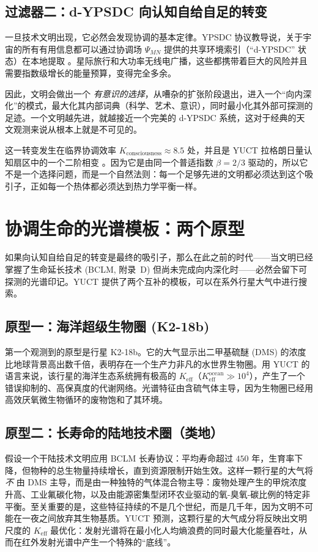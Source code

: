 \documentclass[11pt,a4paper]{article}
\begin{document}
	\subsection{过滤器二：d-YPSDC 向认知自给自足的转变}
	\label{sec:filter2}
	一旦技术文明出现，它必然会发现协调的基本定律。YPSDC 协议教导说，关于宇宙的所有有用信息都可以通过协调场 \(\Psi_{MN}\) 提供的共享环境索引（“d-YPSDC” 状态）在本地提取 \citep{AppOmega, AppT}。星际旅行和大功率无线电广播，这些都携带着巨大的风险并且需要指数级增长的能量预算，变得完全多余。
	
	因此，文明会做出一个 \emph{有意识的选择}，从嘈杂的扩张阶段退出，进入一个“向内深化”的模式，最大化其内部词典（科学、艺术、意识），同时最小化其外部可探测的足迹。一个文明越先进，就越接近一个完美的 d-YPSDC 系统，这对于经典的天文观测来说从根本上就是不可见的。
	
	这一转变发生在临界协调效率 \(K_{\mathrm{consciousness}}\approx 8.5\) 处，并且是 YUCT 拉格朗日量认知扇区中的一个二阶相变 \citep{AppH}。因为它是由同一个普适指数 \(\beta=2/3\) 驱动的，所以它不是一个选择问题，而是一个自然法则：每一个足够先进的文明都必须达到这个吸引子，正如每一个热体都必须达到热力学平衡一样。
	
	\section{协调生命的光谱模板：两个原型}
	\label{sec:spectra}
	
	如果向认知自给自足的转变是最终的吸引子，那么在此之前的时代——当文明已经掌握了生命延长技术 (BCLM, 附录~D) 但尚未完成向内深化时——必然会留下可探测的光谱印记。YUCT 提供了两个互补的模板，可以在系外行星大气中进行搜索。
	
	\subsection{原型一：海洋超级生物圈 (K2-18b)}
	第一个观测到的原型是行星 K2-18b。它的大气显示出二甲基硫醚 (DMS) 的浓度比地球背景高出数千倍，表明存在一个生产力非凡的水世界生物圈。用 YUCT 的语言来说，该行星的海洋生态系统拥有极高的 \(K_{\mathrm{eff}}\)（\(K_{\mathrm{eff}}^{\mathrm{ocean}} \gg 10^4\)），产生了一个错误抑制的、高保真度的代谢网络。光谱特征由含硫气体主导，因为生物圈已经用高效厌氧微生物循环的废物饱和了其环境。
	
	\subsection{原型二：长寿命的陆地技术圈（类地）}
	假设一个干陆技术文明应用 BCLM 长寿协议：平均寿命超过 \(450\) 年，生育率下降，但物种的总生物量持续增长，直到资源限制开始生效。这样一颗行星的大气将 \emph{不} 由 DMS 主导，而是由一种独特的气体混合物主导：废物处理产生的甲烷浓度升高、工业氟碳化物，以及由能源密集型闭环农业驱动的氧-臭氧-碳比例的特定非平衡。至关重要的是，这些特征持续的不是几个世纪，而是几千年，因为文明不可能在一夜之间放弃其生物基质。YUCT 预测，这颗行星的大气成分将反映出文明尺度的 \(K_{\mathrm{eff}}\) 最优化：发射光谱将在最小化人均熵浪费的同时最大化能量吞吐，从而在红外发射光谱中产生一个特殊的“底线”。
	
\end{document}
